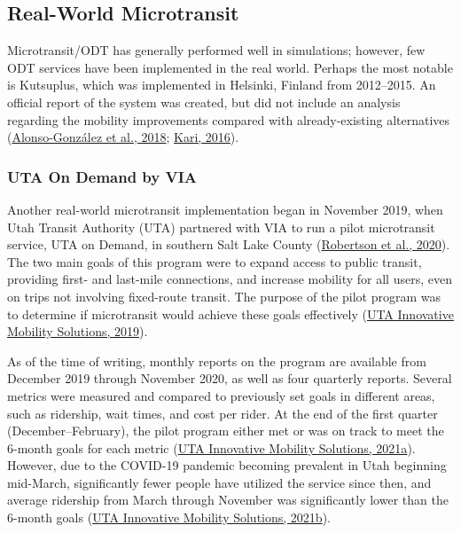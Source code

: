 \documentclass[
]{article}
\begin{document}
\hypertarget{real-world-microtransit}{%
\subsection{Real-World Microtransit}\label{real-world-microtransit}}

Microtransit/ODT has generally performed well in simulations; however, few ODT services have been implemented in the real world. Perhaps the most notable is Kutsuplus, which was implemented in Helsinki, Finland from 2012--2015. An official report of the system was created, but did not include an analysis regarding the mobility improvements compared with already-existing alternatives (\protect\hyperlink{ref-Alonso-Gonzalez2018}{Alonso-González et al., 2018}; \protect\hyperlink{ref-Kari2016}{Kari, 2016}).

\hypertarget{uta-on-demand-by-via}{%
\subsubsection{UTA On Demand by VIA}\label{uta-on-demand-by-via}}

Another real-world microtransit implementation began in November 2019, when Utah Transit Authority (UTA) partnered with VIA to run a pilot microtransit service, UTA on Demand, in southern Salt Lake County (\protect\hyperlink{ref-UTAreport}{Robertson et al., 2020}). The two main goals of this program were to expand access to public transit, providing first- and last-mile connections, and increase mobility for all users, even on trips not involving fixed-route transit. The purpose of the pilot program was to determine if microtransit would achieve these goals effectively (\protect\hyperlink{ref-UTAevalDEC}{UTA Innovative Mobility Solutions, 2019}).

As of the time of writing, monthly reports on the program are available from December 2019 through November 2020, as well as four quarterly reports. Several metrics were measured and compared to previously set goals in different areas, such as ridership, wait times, and cost per rider. At the end of the first quarter (December--February), the pilot program either met or was on track to meet the 6-month goals for each metric (\protect\hyperlink{ref-UTAevalQ1}{UTA Innovative Mobility Solutions, 2021a}). However, due to the COVID-19 pandemic becoming prevalent in Utah beginning mid-March, significantly fewer people have utilized the service since then, and average ridership from March through November was significantly lower than the 6-month goals (\protect\hyperlink{ref-UTAevalQ3}{UTA Innovative Mobility Solutions, 2021b}).
\end{document}

